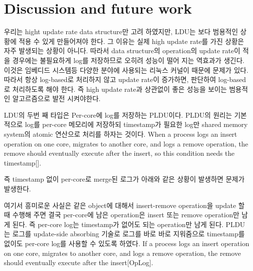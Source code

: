 \section{Discussion and future work}

\ifkor
우리는 hight update rate data structure만 고려 하였지만, LDU는 보다 범용적인 상황에 적용 수 있게 만들어져야
한다.
그 이유는 실제 high update rate를 가진 상황은 자주 발생되는 상황이 아니다. 
따라서 data structure의 operation의 update rate이 적을 경우에는 불필요하게 log를 저장하므로 오히려 성능이 떨어
지는 역효과가 생긴다.
이것은 임베디드 시스템등 다양한 분야에 사용되는 리눅스 커널이 때문에 문제가 있다. 
따라서 항상 log-based로 처리하지 않고 update rate이 증가하면, 판단하여 log-based로 처리하도록 해야 한다.
즉 high update rate과 상관없이 좋은 성능을 보이는 범용적인 알고르즘으로 발전 시켜야한다.
\else

\fi


\ifkor
LDU의 두번 째 타입은 Per-core에 log를 저장하는 PLDU이다. 
PLDU의 원리는 기본적으로 log를 per-core 메모리에 저장하되 timestamp가 필요한 log만 shared memory
system의 atomic 연산으로 처리를 하자는 것이다.
When a process logs an insert operation on one core, migrates to another core,
and logs a remove operation, the remove should eventually execute after the
insert, so this condition needs the timestamp[].

즉 timestamp 없이 per-core로 merge된 로그가 아래와 같은 상황이 발생하면 문제가 발생한다. 

    

여기서 흥미로운 사실은 같은 object에 대해서 insert-remove operation을 update 할 때 수행해
주면 결국 per-core에 남은 operation은 insert 또는 remove operation만 남게 된다. 
즉 per-core log는 timestamp가 없어도 되는 operation만 남게 된다.
PLDU는 로그를 update-side absorbing 기술로 로그를 바로 바로 지워줌으로 timestamp를 없이도 per-core
log를 사용할 수 있도록 하였다.
\else
If a process logs an insert operation on one core,
migrates to another core, and logs a remove operation, the remove should
eventually execute after the insert[OpLog].
\fi



